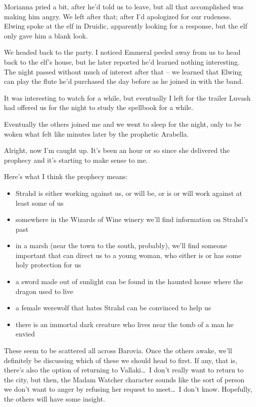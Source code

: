 Morianna pried a bit, after he'd told us to leave, but all that accomplished was making him angry. We left after that; after I'd apologized for our rudeness. Elwing spoke at the elf in Druidic, apparently looking for a response, but the elf only gave him a blank look.

We headed back to the party. I noticed Emmeral peeled away from us to head back to the elf's house, but he later reported he'd learned nothing interesting. The night passed without much of interest after that -- we learned that Elwing can play the flute he'd purchased the day before as he joined in with the band.

It was interesting to watch for a while, but eventually I left for the trailer Luvash had offered us for the night to study the spellbook for a while.

Eventually the others joined me and we went to sleep for the night, only to be woken what felt like minutes later by the prophetic Arabella.

Alright, now I'm caught up. It's been an hour or so since she delivered the prophecy and it's starting to make sense to me.

Here's what I think the prophecy means:
\begin{itemize}
\item Strahd is either working against us, or will be, or is or will work against at least some of us
\item somewhere in the Wizards of Wine winery we'll find information on Strahd's past
\item in a marsh (near the town to the south, probably), we'll find someone important that can direct us to a young woman, who either is or has some holy protection for us
\item a sword made out of sunlight can be found in the haunted house where the dragon used to live
\item a female werewolf that hates Strahd can be convinced to help us
\item there is an immortal dark creature who lives near the tomb of a man he envied
\end{itemize}

These seem to be scattered all across Barovia. Once the others awake, we'll definitely be discussing which of these we should head to first. If any, that is, there's also the option of returning to Vallaki\dots\ I don't really want to return to the city, but then, the Madam Watcher character sounds like the sort of person we don't want to anger by refusing her request to meet\dots\ I don't know. Hopefully, the others will have some insight.

